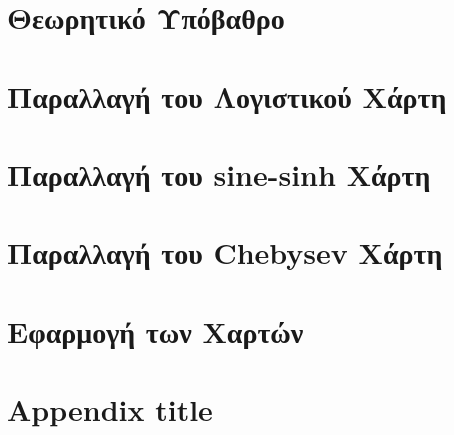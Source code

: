 \documentclass[a4paper,11pt]{report}
\begin{document}


\tableofcontents

\clearpage

\listoffigures
\listoftables
\newpage
{}

\chapter{Θεωρητικό Υπόβαθρο}


\chapter{Παραλλαγή του Λογιστικού Χάρτη}


\chapter{Παραλλαγή του sine-sinh Χάρτη}


\chapter{Παραλλαγή του Chebysev Χάρτη}


\chapter{Εφαρμογή των Χαρτών}


\appendix

\chapter{Appendix title}

\end{document}
